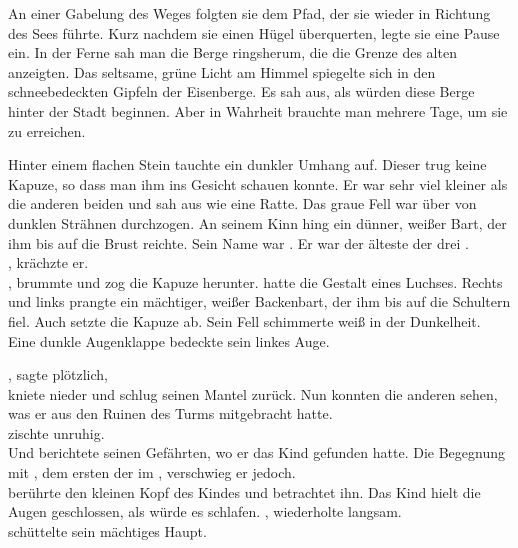 \begin{huge}
An einer Gabelung des Weges folgten sie dem Pfad, der sie wieder in Richtung des Sees führte. Kurz nachdem sie einen Hügel überquerten, legte sie eine Pause ein. In der Ferne sah man die Berge ringsherum, die die Grenze des alten  anzeigten. Das seltsame, grüne Licht am Himmel spiegelte sich in den schneebedeckten Gipfeln der Eisenberge. Es sah aus, als würden diese Berge hinter der Stadt {\Tern} beginnen. Aber in Wahrheit brauchte man mehrere Tage, um sie zu erreichen.

Hinter einem flachen Stein tauchte ein dunkler Umhang auf. Dieser {\Schattenlaufer} trug keine Kapuze, so dass man ihm ins Gesicht schauen konnte. Er war sehr viel kleiner als die anderen beiden und sah aus wie eine Ratte. Das graue Fell war über von dunklen Strähnen durchzogen. An seinem Kinn hing ein dünner, weißer Bart, der ihm bis auf die Brust reichte. Sein Name war {\Dolo}. Er war der älteste der drei {\Schattenlaufer}.\\
, krächzte er.\\
, brummte {\Bomar} und zog die Kapuze herunter. 
{\Bomar} hatte die Gestalt eines Luchses. Rechts und links prangte ein mächtiger, weißer Backenbart, der ihm bis auf die Schultern fiel. Auch {\Eno} setzte die Kapuze ab. Sein Fell schimmerte weiß in der Dunkelheit. Eine dunkle Augenklappe bedeckte sein linkes Auge.

\q{{\Eno}}, sagte {\Dolo} plötzlich, \\
{\Eno} kniete nieder und schlug seinen Mantel zurück. Nun konnten die anderen sehen, was er aus den Ruinen des Turms mitgebracht hatte.\\
 zischte {\Bomar} unruhig. \\
Und {\Eno} berichtete seinen Gefährten, wo er das Kind gefunden hatte. Die Begegnung mit {\Pato}, dem ersten der {\Bangiri} im {\Enland}, verschwieg er jedoch.\\
{\Dolo} berührte den kleinen Kopf des Kindes und betrachtet ihn. Das Kind hielt die Augen geschlossen, als würde es schlafen. , wiederholte {\Dolo} langsam. \\
{\Bomar} schüttelte sein mächtiges Haupt. 


\end{huge}
